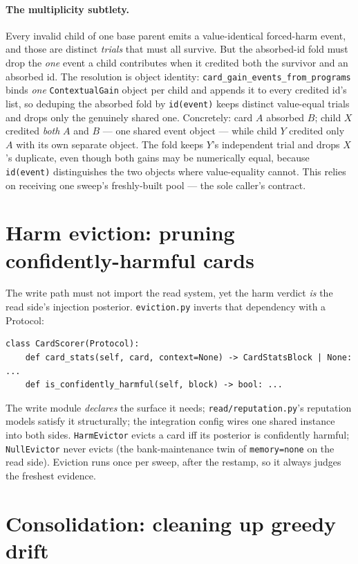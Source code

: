\documentclass[11pt]{article}
\newcommand{\code}[1]{\texttt{\small #1}}
\begin{document}
\paragraph{The multiplicity subtlety.} Every invalid child of one base parent
emits a value-identical forced-harm event, and those are distinct \emph{trials}
that must all survive. But the absorbed-id fold must drop the \emph{one} event a
child contributes when it credited both the survivor and an absorbed id. The
resolution is object identity: \code{card\_gain\_events\_from\_programs} binds
\emph{one} \code{ContextualGain} object per child and appends it to every
credited id's list, so deduping the absorbed fold by \code{id(event)} keeps
distinct value-equal trials and drops only the genuinely shared one. Concretely:
card $A$ absorbed $B$; child $X$ credited \emph{both} $A$ and $B$ --- one shared
event object --- while child $Y$ credited only $A$ with its own separate object.
The fold keeps $Y$'s independent trial and drops $X$'s duplicate, even though both
gains may be numerically equal, because \code{id(event)} distinguishes the two
objects where value-equality cannot. This relies on receiving one sweep's
freshly-built pool --- the sole caller's contract.

\section{Harm eviction: pruning confidently-harmful cards}
\label{sec:evict}

The write path must not import the read system, yet the harm verdict \emph{is}
the read side's injection posterior. \code{eviction.py} inverts that dependency
with a Protocol:

\begin{lstlisting}[style=py]
class CardScorer(Protocol):
    def card_stats(self, card, context=None) -> CardStatsBlock | None: ...
    def is_confidently_harmful(self, block) -> bool: ...
\end{lstlisting}

The write module \emph{declares} the surface it needs; \code{read/reputation.py}'s
reputation models satisfy it structurally; the integration config wires one
shared instance into both sides. \code{HarmEvictor} evicts a card iff its
posterior is confidently harmful; \code{NullEvictor} never evicts (the
bank-maintenance twin of \code{memory=none} on the read side). Eviction runs once
per sweep, after the restamp, so it always judges the freshest evidence.

\section{Consolidation: cleaning up greedy drift}
\label{sec:consolidation}
\end{document}
